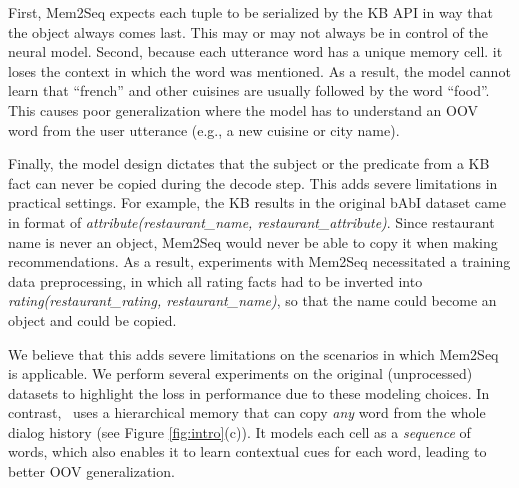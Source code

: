 First, Mem2Seq expects each tuple to be serialized by the KB API in way that the object always comes last. This may or may not always be in control of the neural model.  Second, because each utterance word has a unique memory cell. it loses the context in which the word was mentioned. As a result, the model cannot learn that ``french'' and other cuisines are usually followed by the word ``food''. This causes poor generalization where the model has to understand an OOV word from the user utterance (e.g., a new cuisine or city name). 

Finally, the model design dictates that the subject or the predicate from a KB fact can never be copied during the decode step. This adds severe limitations in practical settings. For example, the KB results in the original bAbI dataset \cite{BordesW16} came in format of {\em attribute(restaurant\_name, restaurant\_attribute)}. Since restaurant name is never an object, Mem2Seq would never be able to copy it when making recommendations. As a result, experiments with Mem2Seq necessitated a training data preprocessing, in which all rating facts had to be inverted into {\em rating(restaurant\_rating, restaurant\_name)}, so that the name could become an object and could be copied. 

We believe that this adds severe limitations on the scenarios in which Mem2Seq is applicable. We perform several experiments on the original (unprocessed) datasets to highlight the loss in performance due to these modeling choices. 
In contrast, \sys\ uses a hierarchical memory that can copy {\em any} word from the whole dialog history (see Figure \ref{fig:intro}(c)). It models each cell as a {\em sequence} of words, which also enables it to learn contextual cues for each word, leading to better OOV generalization. 



